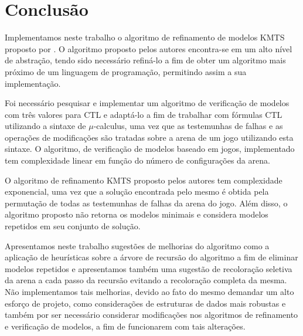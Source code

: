 \documentclass[normaltoc,capchap,capsec,times]{abnt}
\begin{document}



\chapter{Conclusão}
\label{cap:conclusao}
%


Implementamos neste trabalho o algoritmo de refinamento de modelos KMTS proposto por \cite{aline}. O algoritmo proposto pelos autores encontra-se em um alto nível de abstração, tendo sido necessário refiná-lo a fim de obter um algoritmo mais próximo de um linguagem de programação, permitindo assim a sua implementação. 

Foi necessário pesquisar e implementar um algoritmo de verificação de modelos com três valores para CTL e adaptá-lo a fim de trabalhar com fórmulas CTL utilizando a sintaxe de $\mu$-calculus, uma vez que as testemunhas de falhas e as operações de modificações são tratadas sobre a arena de um jogo utilizando esta sintaxe. O algoritmo, de verificação de modelos baseado em jogos, implementado tem complexidade linear em função do número de configurações da arena.

O algoritmo de refinamento KMTS proposto pelos autores tem complexidade exponencial, uma vez que a solução encontrada pelo mesmo é obtida pela permutação de todas as testemunhas de falhas da arena do jogo. Além disso, o algoritmo proposto não retorna os modelos minimais e considera modelos repetidos em seu conjunto de solução. 

Apresentamos neste trabalho sugestões de melhorias do algoritmo como a aplicação de heurísticas sobre a árvore de recursão do algoritmo a fim de eliminar modelos repetidos e apresentamos também uma sugestão de recoloração seletiva da arena a cada passo da recursão evitando a recoloração completa da mesma. Não implementamos tais melhorias, devido ao fato do mesmo demandar um alto esforço de projeto, como considerações de estruturas de dados mais robustas e também por ser necessário considerar modificações nos algoritmos de refinamento e verificação de modelos, a fim de funcionarem com tais alterações.
\end{document}
